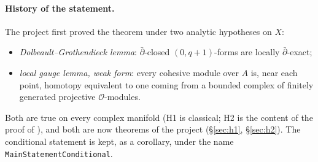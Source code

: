\documentclass[11pt,a4paper]{article}
\newcommand{\code}[1]{\texttt{#1}}
\newcommand{\Ocal}{\mathcal{O}}
\newcommand{\dbar}{\bar\partial}
\begin{document}
\paragraph{History of the statement.} The project first proved the theorem under two analytic
hypotheses on $X$:
\begin{itemize}
\item[(H1)] \emph{Dolbeault--Grothendieck lemma}: $\dbar$-closed $(0,q{+}1)$-forms are locally
$\dbar$-exact;
\item[(H2)] \emph{local gauge lemma, weak form}: every cohesive module over $A$ is, near each
point, homotopy equivalent to one coming from a bounded complex of finitely generated projective
$\Ocal$-modules.
\end{itemize}
Both are true on every complex manifold (H1 is classical; H2 is the content of the proof of
\cite[Lemma~4.1.5]{B}), and both are now theorems of the project (\S\ref{sec:h1}, \S\ref{sec:h2}). The
conditional statement is kept, as a corollary, under the name \code{MainStatementConditional}.
\end{document}

